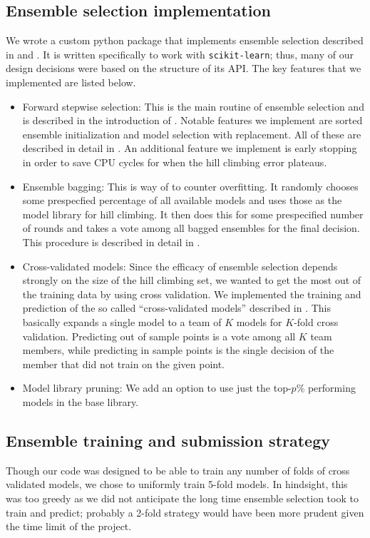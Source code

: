 \documentclass{article}
\renewcommand{\(}{\left(}
\renewcommand{\)}{\right)}
\begin{document}
\subsection{Ensemble selection implementation}
We wrote a custom python package that implements ensemble selection described in \cite{caruana04} and \cite{caruana06}. It is written specifically to work with \texttt{scikit-learn}; thus, many of our design decisions were based on the structure of its API. The key features that we implemented are listed below.
\begin{itemize}
  \item Forward stepwise selection: This is the main routine of ensemble selection and is described in the introduction of \cite{caruana04}. Notable features we implement are sorted ensemble initialization and model selection with replacement. All of these are described in detail in \cite{caruana04}. An additional feature we implement is early stopping in order to save CPU cycles for when the hill climbing error plateaus. 

  \item Ensemble bagging: This is way of to counter overfitting. It randomly chooses some prespecfied percentage of all available models and uses those as the model library for hill climbing. It then does this for some prespecified number of rounds and takes a vote among all bagged ensembles for the final decision. This procedure is described in detail in \cite{caruana04}.

  \item Cross-validated models: Since the efficacy of ensemble selection depends strongly on the size of the hill climbing set, we wanted to get the most out of the training data by using cross validation. We implemented the training and prediction of the so called ``cross-validated models'' described in \cite{caruana06}. This basically expands a single model to a team of $K$ models for $K$-fold cross validation. Predicting out of sample points is a vote among all $K$ team members, while predicting in sample points is the single decision of the member that did not train on the given point. 

  \item Model library pruning: We add an option to use just the top-$p$\% performing models in the base library. 
\end{itemize}

\subsection{Ensemble training and submission strategy}
Though our code was designed to be able to train any number of folds of cross validated models, we chose to uniformly train 5-fold models. In hindsight, this was too greedy as we did not anticipate the long time ensemble selection took to train and predict; probably a 2-fold strategy would have been more prudent given the time limit of the project. 
\end{document}
